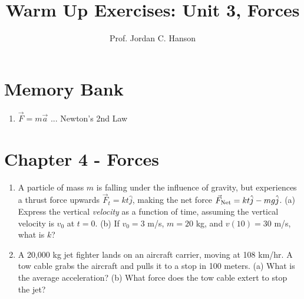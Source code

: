 \documentclass{article}
\begin{document}
\title{Warm Up Exercises: Unit 3, Forces}
\author{Prof. Jordan C. Hanson}

\maketitle

\section{Memory Bank}

\begin{enumerate}
\item $\vec{F} = m \vec{a}$ ... Newton's 2nd Law
\end{enumerate}

\section{Chapter 4 - Forces}

\begin{enumerate}
\item A particle of mass $m$ is falling under the influence of gravity, but experiences a thrust force upwards $\vec{F}_t = kt\hat{j}$, making the net force $\vec{F}_{\rm Net} = kt\hat{j}-mg\hat{j}$.  (a) Express the vertical \textit{velocity} as a function of time, assuming the vertical velocity is $v_0$ at $t=0$. (b) If $v_0 = 3$ m/s, $m = 20$ kg, and $v(10) = 30$ m/s, what is $k$? \\ \vspace{3cm}
\item A 20,000 kg jet fighter lands on an aircraft carrier, moving at 108 km/hr. A tow cable grabs the aircraft and pulls it to a stop in 100 meters. (a) What is the average acceleration? (b) What force does the tow cable extert to stop the jet?
\end{enumerate}
\end{document}
